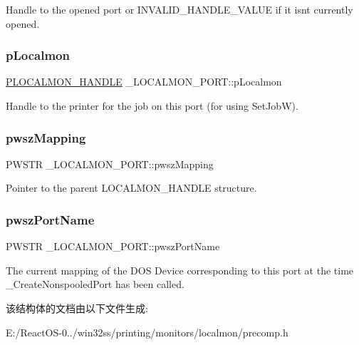 Handle to the opened port or I\+N\+V\+A\+L\+I\+D\+\_\+\+H\+A\+N\+D\+L\+E\+\_\+\+V\+A\+L\+UE if it isn\textquotesingle{}t currently opened. \mbox{\label{struct___l_o_c_a_l_m_o_n___p_o_r_t_a65a47d188e0dc76fa39a891f04e7d45a}} 
\subsubsection{\texorpdfstring{p\+Localmon}{pLocalmon}}
{\footnotesize\ttfamily \hyperlink{struct___l_o_c_a_l_m_o_n___h_a_n_d_l_e}{P\+L\+O\+C\+A\+L\+M\+O\+N\+\_\+\+H\+A\+N\+D\+LE} \+\_\+\+L\+O\+C\+A\+L\+M\+O\+N\+\_\+\+P\+O\+R\+T\+::p\+Localmon}

Handle to the printer for the job on this port (for using Set\+JobW). \mbox{\label{struct___l_o_c_a_l_m_o_n___p_o_r_t_a6cdc154efd2048a59da307eb25276eca}} 
\subsubsection{\texorpdfstring{pwsz\+Mapping}{pwszMapping}}
{\footnotesize\ttfamily P\+W\+S\+TR \+\_\+\+L\+O\+C\+A\+L\+M\+O\+N\+\_\+\+P\+O\+R\+T\+::pwsz\+Mapping}

Pointer to the parent L\+O\+C\+A\+L\+M\+O\+N\+\_\+\+H\+A\+N\+D\+LE structure. \mbox{\label{struct___l_o_c_a_l_m_o_n___p_o_r_t_a1ceac66d08e0ee457051c8bf794f312f}} 
\subsubsection{\texorpdfstring{pwsz\+Port\+Name}{pwszPortName}}
{\footnotesize\ttfamily P\+W\+S\+TR \+\_\+\+L\+O\+C\+A\+L\+M\+O\+N\+\_\+\+P\+O\+R\+T\+::pwsz\+Port\+Name}

The current mapping of the D\+OS Device corresponding to this port at the time \+\_\+\+Create\+Nonspooled\+Port has been called. 

该结构体的文档由以下文件生成\+:\begin{DoxyCompactItemize}
\item 
E\+:/\+React\+O\+S-\/0../win32ss/printing/monitors/localmon/precomp.\+h\end{DoxyCompactItemize}
